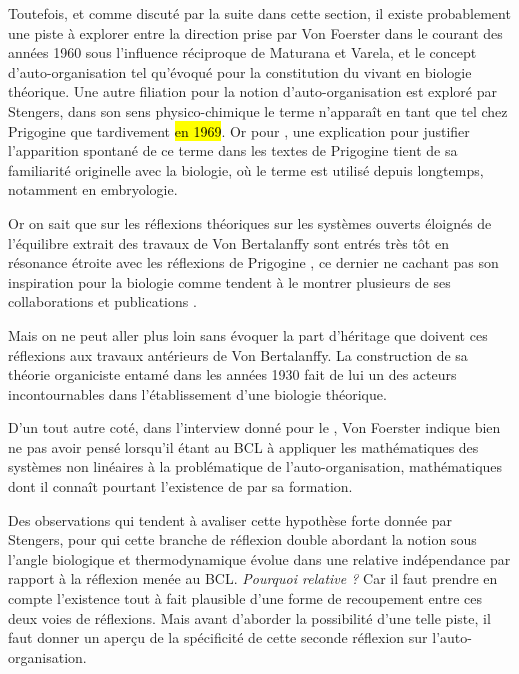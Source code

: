 Toutefois, et comme discuté par la suite dans cette section, il existe probablement une piste à explorer entre la direction prise par Von Foerster dans le courant des années 1960 sous l'influence réciproque de Maturana et Varela, et le concept d'auto-organisation tel qu'évoqué pour la constitution du vivant en biologie théorique. Une autre filiation pour la notion d'auto-organisation est exploré par Stengers, dans son sens physico-chimique le terme n’apparaît en tant que tel chez Prigogine que tardivement \hl{en 1969}. Or pour \textcite[64]{Stengers1985}, une explication pour justifier l'apparition spontané de ce terme dans les textes de Prigogine tient de sa familiarité originelle avec la biologie, où le terme est utilisé depuis longtemps, notamment en embryologie.

Or on sait que sur les réflexions théoriques sur les systèmes ouverts éloignés de l'équilibre extrait des travaux de Von Bertalanffy sont entrés très tôt en résonance étroite \autocite[653-661]{Pouvreau2013} avec les réflexions de Prigogine \autocite{Prigogine1996}, ce dernier ne cachant pas son inspiration pour la biologie comme tendent à le montrer plusieurs de ses collaborations et publications \autocites[59-67]{Stengers1985}{Prigogine1946}.

Mais on ne peut aller plus loin sans évoquer la part d'héritage que doivent ces réflexions aux travaux antérieurs de Von Bertalanffy. La construction de sa théorie organiciste  entamé dans les années 1930 fait de lui un des acteurs incontournables dans l'établissement d'une biologie théorique.

D'un tout autre coté, dans l'interview donné pour le \textcite[255]{CREA1985}, Von Foerster indique bien ne pas avoir pensé lorsqu'il étant au BCL à appliquer les mathématiques des systèmes non linéaires à la problématique de l'auto-organisation, mathématiques dont il connaît pourtant l'existence de par sa formation.


Des observations qui tendent à avaliser cette hypothèse forte donnée par Stengers, pour qui cette branche de réflexion double abordant la notion sous l'angle biologique et thermodynamique évolue dans une relative indépendance par rapport à la réflexion menée au BCL. \textit{Pourquoi relative ?} Car il faut prendre en compte l'existence tout à fait plausible d'une forme de recoupement entre ces deux voies de réflexions. Mais avant d'aborder la possibilité d'une telle piste, il faut donner un aperçu de la spécificité de cette seconde réflexion sur l'auto-organisation.

